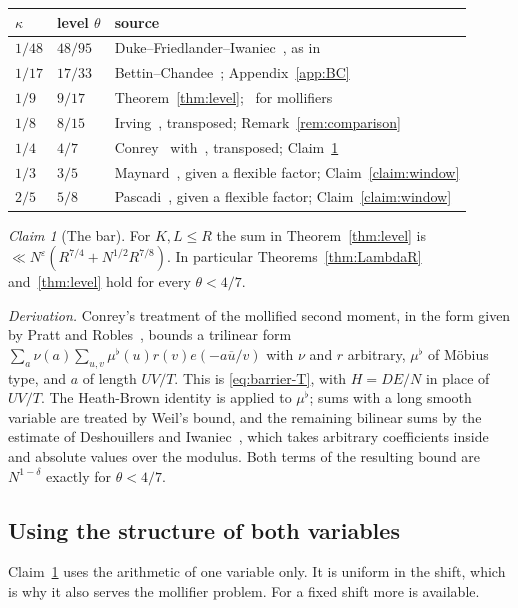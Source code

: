 \documentclass[11pt]{amsart}
\theoremstyle{definition}
\theoremstyle{remark}
\newtheorem{claim}[theorem]{Claim}
\numberwithin{equation}{section}
\newcommand{\eps}{\varepsilon}
\newcommand{\inv}[1]{\overline{#1}}
\begin{document}
\medskip
\begin{center}
\begin{tabular}{lll}
$\kappa$ & level $\theta$ & source \\ \hline
$1/48$ & $48/95$ & Duke--Friedlander--Iwaniec~\cite{DFI}, as in~\cite{CL}\\
$1/17$ & $17/33$ & Bettin--Chandee~\cite{BC}; Appendix~\ref{app:BC}\\
$1/9$ & $9/17$ & Theorem~\ref{thm:level};~\cite{BCHB} for mollifiers\\
$1/8$ & $8/15$ & Irving~\cite{Irv14}, transposed; Remark~\ref{rem:comparison}\\
$1/4$ & $4/7$ & Conrey~\cite{Con89} with~\cite{DI82}, transposed; Claim~\ref{claim:conrey}\\
$1/3$ & $3/5$ & Maynard~\cite{May2}, given a flexible factor; Claim~\ref{claim:window}\\
$2/5$ & $5/8$ & Pascadi~\cite{Pas25}, given a flexible factor; Claim~\ref{claim:window}
\end{tabular}
\end{center}
\medskip

\begin{claim}[The bar]\label{claim:conrey}
For $K,L\le R$ the sum in Theorem~\ref{thm:level} is
$\ll N^{\eps}(R^{7/4}+N^{1/2}R^{7/8})$.  In particular
Theorems~\ref{thm:LambdaR} and~\ref{thm:level} hold for every
$\theta<4/7$.
\end{claim}

\emph{Derivation.}  Conrey's treatment of the mollified second moment, in
the form given by Pratt and Robles~\cite[\S3.2.6]{PR18}, bounds a trilinear
form $\sum_a\nu(a)\sum_{u,v}\mu^\flat(u)r(v)e(-a\inv u/v)$ with $\nu$ and $r$
arbitrary, $\mu^\flat$ of M\"obius type, and $a$ of length $UV/T$.  This is
\eqref{eq:barrier-T}, with $H=DE/N$ in place of $UV/T$.  The Heath-Brown
identity is applied to $\mu^\flat$; sums with a long smooth variable are
treated by Weil's bound, and the remaining bilinear sums by the estimate of
Deshouillers and Iwaniec~\cite{DI82}, which takes arbitrary coefficients
inside and absolute values over the modulus.  Both terms of the resulting
bound are $N^{1-\delta}$ exactly for $\theta<4/7$.

\subsection{Using the structure of both variables}\label{sec:twosided}
Claim~\ref{claim:conrey} uses the arithmetic of one variable only.  It is
uniform in the shift, which is why it also serves the mollifier problem.
For a fixed shift more is available.
\end{document}
